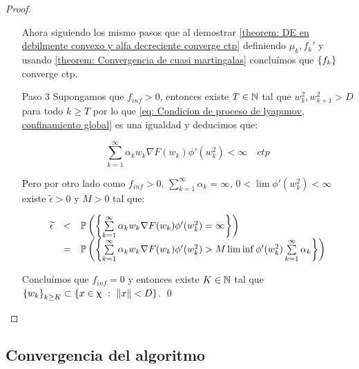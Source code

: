 \begin{proof}
\begin{enumerate}
		
		Ahora siguiendo los mismo pasos que al demostrar \ref{theorem: DE en debilmente convexo y alfa decreciente converge ctp} definiendo $\mu_k, f_k'$ y usando \ref{theorem: Convergencia de cuasi martingalas} conclu\'imos que $\left\lbrace f_k\right\rbrace$ converge ctp.
		
		\item[Paso 3] Supongamos que $f_{inf} >0$, entonces existe $T \in {\mathbb{N}}$  tal que $w_k^2, w_{k+1}^2 > D$ para todo $k \geq T$ por lo que \ref{eq: Condicion de proceso de lyapunov, confinamiento global} es una igualdad y deducimos que:
		
		\begin{equation}
			\sum\limits_{k=1}^{\infty} {\alpha_k w_k \nabla F(w_k) \phi'(w_k^2)} < \infty \quad ctp
		\end{equation}
		
		Pero por otro lado como $f_{inf} >0$, $\sum\limits_{k=1}^{\infty} {\alpha_k} = \infty$, $0 < \lim \phi'(w_k^2) < \infty$ existe $\widetilde{\epsilon} > 0$ y $M > 0$ tal que:
		
		\begin{equation*}
			\begin{array}{rcl}
			\widetilde{\epsilon} & < & \mathbb{P} \left(\left\lbrace\sum\limits_{k=1}^{\infty} {\alpha_k w_k \nabla F(w_k) \phi'(w_k^2)} = \infty \right\rbrace\right) \\
			& = & \mathbb{P} \left(\left\lbrace\sum\limits_{k=1}^{\infty} {\alpha_k w_k \nabla F(w_k) \phi'(w_k^2)} > M \liminf \phi'(w_k^2)\sum\limits_{k=1}^{\infty} {\alpha_k}\right\rbrace\right) 
			\end{array}
		\end{equation*}
		
		Conclu\'imos que $f_{inf} = 0$ y entonces existe $K \in {\mathbb{N}}$ tal que $\left\lbrace w_k\right\rbrace_{k \geq K} \subset \left\lbrace x \in \upchi ~:~ \left\lVert x\right\rVert < D \right\rbrace$. \qed
		
	\end{enumerate}
	
\end{proof}

\subsection{Convergencia del algoritmo}


